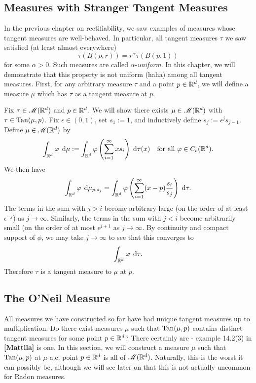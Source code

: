 \subsection{Measures with Stranger Tangent Measures}

In the previous chapter on rectifiability, we saw examples of measures whose tangent measures are well-behaved. In particular, all tangent measures $\tau$ we saw satisfied (at least almost everywhere)
\begin{equation}
    \tau(B(p,r)) = r^\alpha \tau(B(p,1))
\end{equation}
for some $\alpha > 0$. Such measures are called $\alpha$-\textit{uniform}. In this chapter, we will demonstrate that this property is not uniform (haha) among all tangent measures. First, for any arbitrary measure $\tau$ and a point $p \in \mathbb{R}^d$, we will define a measure $\mu$ which has $\tau$ as a tangent measure at $p$.

Fix $\tau \in \mathscr{M}(\mathbb{R}^d)$ and $p \in \mathbb{R}^d$. We will show there exists $\mu \in \mathscr{M}(\mathbb{R}^d)$ with $\tau \in \operatorname{Tan}(\mu,p)$. Fix $\epsilon \in (0,1)$, set $s_1 := 1$, and inductively define $s_j := \epsilon^j s_{j-1}$. Define $\mu \in \mathscr{M}(\mathbb{R}^d)$ by
\begin{equation}
    \int_{\mathbb{R}^d} \varphi \; \operatorname{d}\!{\mu} := \int_{\mathbb{R}^d} \varphi\left( { \sum_{i=1}^\infty x s_i } \right) \; \operatorname{d}\!{\tau}(x) \quad \text{for all } \varphi \in C_c(\mathbb{R}^d).
\end{equation}
We then have 
\begin{equation}
    \int_{\mathbb{R}^d} \varphi \; \operatorname{d}\!{\mu}_{p,s_j} = \int_{\mathbb{R}^d} \varphi\left( { \sum_{i=1}^\infty (x - p)\frac{s_i}{s_j} } \right) \; \operatorname{d}\!{\tau}.
\end{equation}
The terms in the sum with $j > i$ become arbitrary large (on the order of at least $\epsilon^{-j}$) as $j \to \infty$. Similarly, the terms in the sum with $j < i$ become arbitrarily small (on the order of at most $\epsilon^{j+1}$ as $j \to \infty$. By continuity and compact support of $\phi$, we may take $j \to \infty$ to see that this converges to
\begin{equation}
    \int_{\mathbb{R}^d} \varphi \; \operatorname{d}\!{\tau}.
\end{equation}
Therefore $\tau$ is a tangent measure to $\mu$ at $p$. 

\subsection{The O'Neil Measure}
All measures we have constructed so far have had unique tangent measures up to multiplication. Do there exist measures $\mu$ such that $\operatorname{Tan}(\mu,p)$ contains distinct tangent measures for some point $p \in \mathbb{R}^d$? There certainly are - example 14.2(3) in \textbf{[Mattila]} is one. In this section, we will construct a measure $\mu$ such that $\operatorname{Tan}(\mu,p)$ at $\mu$-a.e. point $p \in \mathbb{R}^d$ is all of $\mathscr{M}(\mathbb{R}^d)$. Naturally, this is the worst it can possibly be, although we will see later on that this is not actually uncommon for Radon measures. 

